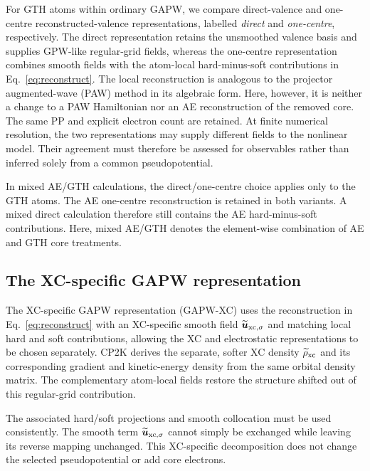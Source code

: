 \documentclass[10pt,a4paper,twocolumn]{article}
\newcommand{\uvec}{\boldsymbol{u}}
\begin{document}
For GTH atoms within ordinary GAPW, we compare direct-valence and one-centre reconstructed-valence representations, labelled \textit{direct} and \textit{one-centre}, respectively. The direct representation retains the unsmoothed valence basis and supplies GPW-like regular-grid fields, whereas the one-centre representation combines smooth fields with the atom-local hard-minus-soft contributions in Eq.~\eqref{eq:reconstruct}. The local reconstruction is analogous to the projector augmented-wave (PAW) method in its algebraic form.\cite{Bloechl1994PAW,Bloechl2026CPPAW} Here, however, it is neither a change to a PAW Hamiltonian nor an AE reconstruction of the removed core. The same PP and explicit electron count are retained. At finite numerical resolution, the two representations may supply different fields to the nonlinear model. Their agreement must therefore be assessed for observables rather than inferred solely from a common pseudopotential.

In mixed AE/GTH calculations, the direct/one-centre choice applies only to the GTH atoms. The AE one-centre reconstruction is retained in both variants. A mixed direct calculation therefore still contains the AE hard-minus-soft contributions. Here, mixed AE/GTH denotes the element-wise combination of AE and GTH core treatments.

\subsection{The XC-specific GAPW representation}

The XC-specific GAPW representation (GAPW-XC) uses the reconstruction in Eq.~\eqref{eq:reconstruct} with an XC-specific smooth field $\widetilde{\uvec}_{{\rm xc},\sigma}$ and matching local hard and soft contributions, allowing the XC and electrostatic representations to be chosen separately. CP2K derives the separate, softer XC density $\widetilde\rho_{\rm xc}$ and its corresponding gradient and kinetic-energy density from the same orbital density matrix. The complementary atom-local fields restore the structure shifted out of this regular-grid contribution.

The associated hard/soft projections and smooth collocation must be used consistently. The smooth term $\widetilde{\uvec}_{{\rm xc},\sigma}$ cannot simply be exchanged while leaving its reverse mapping unchanged. This XC-specific decomposition does not change the selected pseudopotential or add core electrons.
\end{document}
